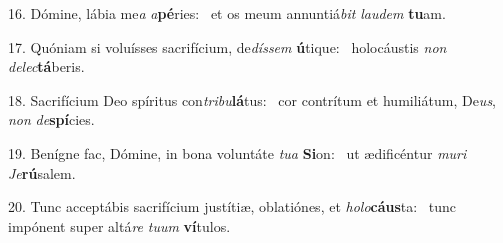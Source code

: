 16. Dómine, lábia me\textit{a} \textit{a}\textbf{pé}ries: \ast\  et os meum annuntiá\textit{bit} \textit{lau}\textit{dem} \textbf{tu}am.\

17. Quóniam si voluísses sacrifícium, de\textit{dís}\textit{sem} \textbf{ú}tique: \ast\  holocáustis \textit{non} \textit{de}\textit{lec}\textbf{tá}beris.\

18. Sacrifícium Deo spíritus con\textit{tri}\textit{bu}\textbf{lá}tus: \ast\  cor contrítum et humiliátum, De\textit{us}, \textit{non} \textit{de}\textbf{spí}cies.\

19. Benígne fac, Dómine, in bona voluntáte \textit{tu}\textit{a} \textbf{Si}on: \ast\  ut ædificéntur \textit{mu}\textit{ri} \textit{Je}\textbf{rú}salem.\

20. Tunc acceptábis sacrifícium justítiæ, oblatiónes, et \textit{ho}\textit{lo}\textbf{cáus}ta: \ast\  tunc impónent super altá\textit{re} \textit{tu}\textit{um} \textbf{ví}tulos.\

